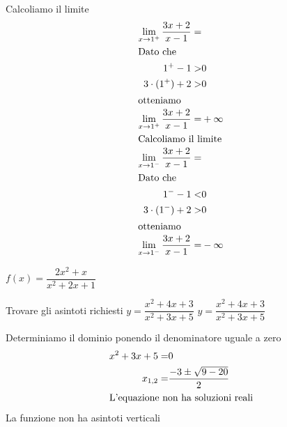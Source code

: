 \begin{exercise}
Calcoliamo il limite
\begin{align*}
\lim_{x\to 1^+}\frac{3x+2}{x-1}=&\\
\intertext{Dato che}
1^+-1>&0\\
3\cdot (1^+)+2>&0\\
\intertext{otteniamo}
\lim_{x\to 1^+}\frac{3x+2}{x-1}=&+\infty\\
\intertext{Calcoliamo il limite}
\lim_{x\to 1^-}\frac{3x+2}{x-1}=&\\
\intertext{Dato che}
1^--1<&0\\
3\cdot (1^-)+2>&0\\
\intertext{otteniamo}
\lim_{x\to 1^-}\frac{3x+2}{x-1}=&-\infty\\
\end{align*} 
\end{exercise}
\begin{exercise}[no solution]
	$f(x)= \dfrac{2x^2+x}{x^2+2x+1}$
\end{exercise}
\begin{exercise}
	Trovare gli asintoti richiesti
$y=\dfrac{x^2+4x+3}{x^2+3x+5}$
	\tcblower
$y=\dfrac{x^2+4x+3}{x^2+3x+5}$	
	
Determiniamo il dominio ponendo il denominatore uguale a zero
\begin{align*}
x^2+3x+5=&0\\ 
x_{1,2}=&\dfrac{-3\pm\sqrt{9-20}}{2}\\
\intertext{L'equazione non ha soluzioni reali}
\end{align*}
La funzione non ha asintoti verticali
\end{exercise}
